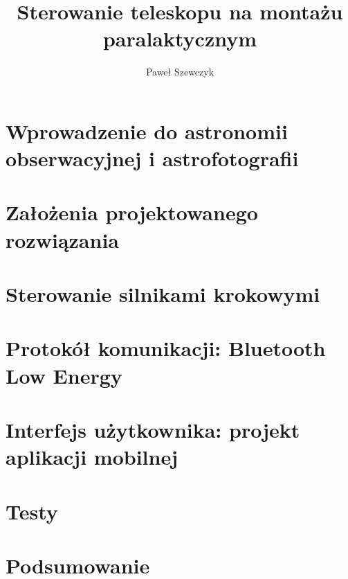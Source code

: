 \documentclass[a4paper,11pt,twoside,openany]{book}
\title{Sterowanie teleskopu na montażu paralaktycznym}
\author{Paweł Szewczyk}
\date{}
\begin{document}
\maketitle

\tableofcontents

\chapter{Wprowadzenie do astronomii obserwacyjnej i astrofotografii}


\chapter{Założenia projektowanego rozwiązania}



\chapter{Sterowanie silnikami krokowymi}


\chapter{Protokół komunikacji: Bluetooth Low Energy}


\chapter{Interfejs użytkownika: projekt aplikacji mobilnej}

\chapter{Testy}

\chapter{Podsumowanie}


\end{document}
